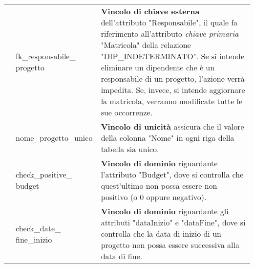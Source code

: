 \begin{center}
\begin{tabular}{|C{2.5cm}|C{3.2cm}|L{9cm}|}
                    & fk\_responsabile\_ progetto 
                    & \textbf{Vincolo di chiave esterna} dell'attributo "Responsabile", il quale fa riferimento all'attributo \textit{chiave primaria}
                    "Matricola" della relazione "DIP\_INDETERMINATO". Se si intende eliminare un dipendente che è un responsabile di un progetto,
                    l'azione verrà impedita. Se, invece, si intende aggiornare la matricola, verranno modificate tutte le sue occorrenze.\\

                    & nome\_progetto\_unico
                    & \textbf{Vincolo di unicità} assicura che il valore della colonna "Nome" in ogni riga della tabella sia unico.\\

                    & check\_positive\_ budget
                    & \textbf{Vincolo di dominio} riguardante l'attributo "Budget", dove si controlla che quest'ultimo
                    non possa essere non positivo (o 0 oppure negativo).\\

                    & check\_date\_ fine\_inizio
                    & \textbf{Vincolo di dominio} riguardante gli attributi "dataInizio" e "dataFine", dove si controlla che
                    la data di inizio di un progetto non possa essere successiva alla data di fine.\\

                \hline
            \end{tabular}
        \end{center}


